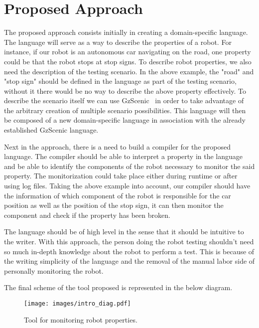 \chapter{Proposed Approach}
\label{chap:approach}


The proposed approach consists initially in creating a domain-specific language.
The language will serve as a way to describe the properties of a robot.
For instance, if our robot is an autonomous car navigating on the road, 
one property could be that the robot stops at stop signs.
To describe robot properties, we also need the description of the testing scenario.
In the above example, the "road" and "stop sign" should be defined in the language as part of the 
testing scenario, without it there would be no way to describe the above property effectively.
To describe the scenario itself we can use GzScenic~\cite{GzScenic} in order to take 
advantage of the arbitrary creation of multiple scenario possibilities.
This language will then be composed of a new domain-specific language in association 
with the already established GzScenic language.

\par

Next in the approach, there is a need to build a compiler for the proposed language.
The compiler should be able to interpret a property in the language and be able to
identify the components of the robot necessary to monitor the said property.
The monitorization could take place either during runtime or after using log files.
Taking the above example into account, our compiler should have the information of which 
component of the robot is responsible for the car position as well as the position of the 
stop sign, it can then monitor the component and check if the property has been broken.

\par

The language should be of high level in the sense that it should be intuitive to the writer.
With this approach, the person doing the robot testing shouldn't need so much in-depth 
knowledge about the robot to perform a test. This is because of the writing simplicity of 
the language and the removal of the manual labor side of personally monitoring the robot.

\par

The final scheme of the tool proposed is represented in the below diagram.

\begin{figure}
    \texttt{[image: images/intro\_diag.pdf]}
    \caption{Tool for monitoring robot properties.}
    \label{fig:intro_objectives}
\end{figure}